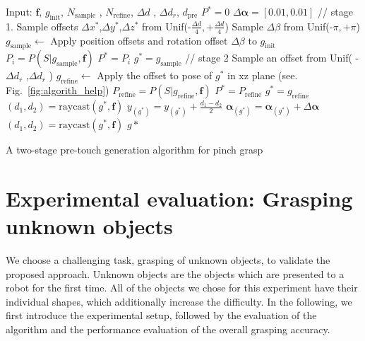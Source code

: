 \begin{algorithm}
\begin{algorithmic}[1]
\STATE Input: $\bm{f} $, $g_{\text{init}}$,  $N_{\text{sample}}$ , $N_{\text{refine}}$, $\Delta d$ , $\Delta d_r$, $d_{\text{pre}}$
\STATE $P^{*} = 0$
\STATE $\Delta \bm{\alpha} = [0.01, 0.01]$
\STATE // stage 1.
\STATE   Sample offsets $\Delta x^{*}$,$\Delta y^{*}$,$\Delta z^{*}$ from  Unif(-$\frac{\Delta d}{4} ,+ \frac{\Delta d}{4}$)
\STATE   Sample $\Delta \beta$ from Unif(-$\pi ,+ \pi$)
\STATE   $g_{\text{sample}} \leftarrow $ Apply position offsets and  rotation offset $\Delta \beta$ to $g_{\text{init}}$ 
\STATE  $P_i = P(S | g_{\text{sample}}, \bm{f})$
\STATE $P^{*} = P_i$
\STATE $g^{*} = g_{\text{sample}} $
\ENDIF  
\ENDFOR 
\STATE // stage 2
\STATE Sample an offset from Unif( -$\Delta d_r$ ,$\Delta d_r$ )
\STATE $g_{\text{refine}} \leftarrow $ Apply the offset to pose of $g^{*}$ in xz plane (see. Fig.~\ref{fig:algorith_help})  
\STATE  $P_{\text{refine}} = P(S | g_{\text{refine}}, \bm{f})$
\STATE $P^{*} = P_{\text{refine}}$
\STATE $g^{*} = g_{\text{refine}} $
\ENDIF
\ENDFOR
\STATE $(d_1,d_2) = \text{raycast}(g^*, \bm{f})$
\STATE $y_{(g^{*})} = y_{(g^{*})} + \frac{d_1-d_2}{2} $ 
\STATE $ \bm{\alpha}_{(g^*)} = \bm{\alpha}_{(g^*)} + \Delta \bm{\alpha}$ 
\STATE $(d_1,d_2) = \text{raycast}(g^*, \bm{f})$
\ENDWHILE
\RETURN $g*$
\caption {A two-stage pre-touch generation algorithm for pinch grasp}
\end{algorithmic}
\end{algorithm}

\section{Experimental evaluation: Grasping unknown objects}
We choose a challenging task, grasping of unknown objects, to validate the proposed approach. Unknown objects are the objects which are presented to a robot for the first time. All of the objects we chose for this experiment have their individual shapes, which additionally increase the difficulty. In the following, we first introduce the experimental setup, followed by the evaluation of the algorithm and the performance evaluation of the overall grasping accuracy. 

